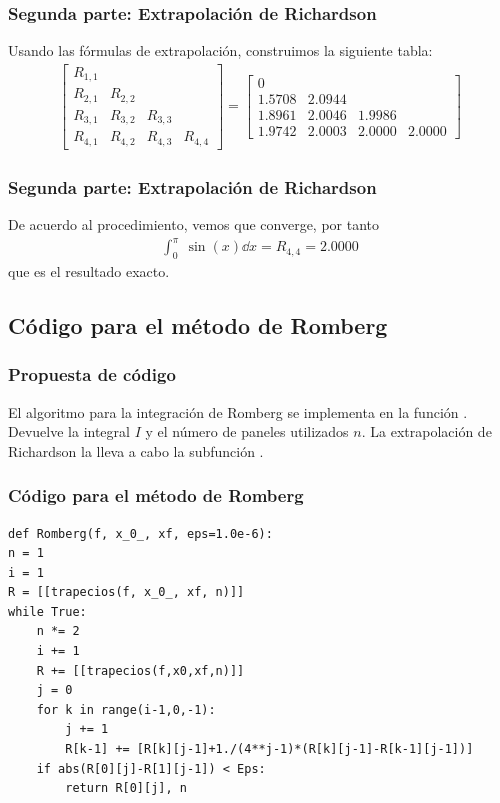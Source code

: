 \begin{frame}
\frametitle{Segunda parte: Extrapolación de Richardson}
Usando las fórmulas de extrapolación, construimos la siguiente tabla:
\fontsize{12}{12}\selectfont
\begin{align*}
\begin{bmatrix}
R_{1, 1} &         &         & \\
R_{2, 1} & R_{2, 2} &         & \\
R_{3, 1} & R_{3, 2} & R_{3, 3} & \\
R_{4, 1} & R_{4, 2} & R_{4, 3} & R_{4, 4} 
\end{bmatrix}
=
\begin{bmatrix}
0      &        &        & \\
1.5708 & 2.0944 &        & \\
1.8961 & 2.0046 & 1.9986 & \\
1.9742 & 2.0003 & 2.0000 & 2.0000
\end{bmatrix}
\end{align*}
\end{frame}
\begin{frame}
\frametitle{Segunda parte: Extrapolación de Richardson}
De acuerdo al procedimiento, vemos que converge, por tanto
\begin{align*}
\int_{0}^{\pi} \: \sin(x) \dd{x} = R_{4, 4} = 2.0000
\end{align*}
que es el resultado exacto.
\end{frame}
\subsection{Código para el método de Romberg}
\begin{frame}
\frametitle{Propuesta de código}
El algoritmo para la integración de Romberg se implementa en la función .
\\
\bigskip
Devuelve la integral $I$ y el número de paneles utilizados $n$. La extrapolación de Richardson la lleva a cabo la subfunción .
\end{frame}
\begin{frame}
\frametitle{Código para el método de Romberg}
\begin{lstlisting}[caption=Código para la función trapecios, style=FormattedNumber, basicstyle=\linespread{1.1}\ttfamily=\small, columns=fullflexible]
def Romberg(f, x_0_, xf, eps=1.0e-6):
n = 1
i = 1
R = [[trapecios(f, x_0_, xf, n)]]
while True:
    n *= 2
    i += 1
    R += [[trapecios(f,x0,xf,n)]]
    j = 0
    for k in range(i-1,0,-1):
        j += 1
        R[k-1] += [R[k][j-1]+1./(4**j-1)*(R[k][j-1]-R[k-1][j-1])]
    if abs(R[0][j]-R[1][j-1]) < Eps:
        return R[0][j], n
 
\end{lstlisting}
\end{frame}

